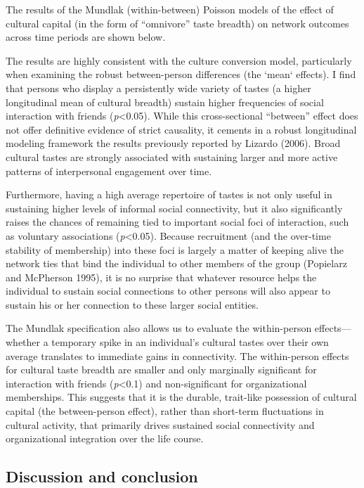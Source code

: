 \documentclass[
]{article}
\begin{document}
The results of the Mundlak (within-between) Poisson models of the effect of cultural capital (in the form of ``omnivore'' taste breadth) on network outcomes across time periods are shown below.



The results are highly consistent with the culture conversion model, particularly when examining the robust between-person differences (the `mean` effects). I find that persons who display a persistently wide variety of tastes (a higher longitudinal mean of cultural breadth) sustain higher frequencies of social interaction with friends (\emph{p}\textless0.05). While this cross-sectional ``between'' effect does not offer definitive evidence of strict causality, it cements in a robust longitudinal modeling framework the results previously reported by Lizardo (2006). Broad cultural tastes are strongly associated with sustaining larger and more active patterns of interpersonal engagement over time. 

Furthermore, having a high average repertoire of tastes is not only useful in sustaining higher levels of informal social connectivity, but it also significantly raises the chances of remaining tied to important social foci of interaction, such as voluntary associations (\emph{p}\textless0.05). Because recruitment (and the over-time stability of membership) into these foci is largely a matter of keeping alive the network ties that bind the individual to other members of the group (Popielarz and McPherson 1995), it is no surprise that whatever resource helps the individual to sustain social connections to other persons will also appear to sustain his or her connection to these larger social entities.

The Mundlak specification also allows us to evaluate the within-person effects---whether a temporary spike in an individual's cultural tastes over their own average translates to immediate gains in connectivity. The within-person effects for cultural taste breadth are smaller and only marginally significant for interaction with friends (\emph{p}\textless0.1) and non-significant for organizational memberships. This suggests that it is the durable, trait-like possession of cultural capital (the between-person effect), rather than short-term fluctuations in cultural activity, that primarily drives sustained social connectivity and organizational integration over the life course.

\subsection{Discussion and conclusion}\label{discussion-and-conclusion}
\end{document}
